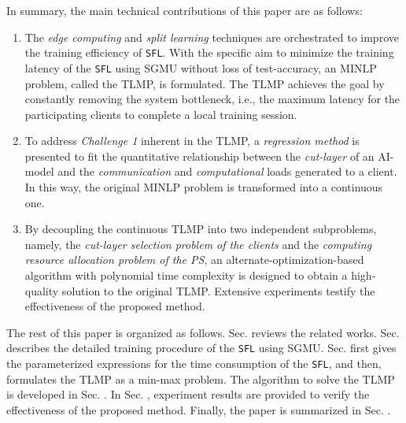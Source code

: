 \documentclass[10pt,journal,transmag]{IEEEtran}
\begin{document}
In summary, the main technical contributions of this paper are as follows:
\begin{enumerate}
    \item The \textit{edge computing} and \textit{split learning} techniques are orchestrated to improve the training efficiency of \texttt{SFL}.
    With the specific aim to minimize the training latency of the \texttt{SFL} using SGMU without loss of test-accuracy, an MINLP problem, called the TLMP, is formulated. The TLMP achieves the goal by constantly removing the system bottleneck, i.e., the maximum latency for the participating clients to complete a local training session.

    \item To address \textit{Challenge 1} inherent in the TLMP, a \textit{regression method} is presented to fit the quantitative relationship between the \textit{cut-layer} of an AI-model and the \textit{communication} and \textit{computational} loads generated to a client. In this way, the original MINLP problem is transformed into a continuous one.

    \item By decoupling the continuous TLMP into two independent subproblems, namely, the \textit{cut-layer selection problem of the clients} and the \textit{computing resource allocation problem of the PS}, an alternate-optimization-based algorithm with polynomial time complexity is designed to obtain a high-quality solution to the original TLMP. 
    Extensive experiments testify the effectiveness of the proposed method.       
\end{enumerate}

The rest of this paper is organized as follows. Sec. \uppercase\expandafter{} reviews the related works. Sec. \uppercase\expandafter{} describes the detailed training procedure of the \texttt{SFL} using SGMU. Sec. \uppercase\expandafter{} first gives the parameterized expressions for the time consumption of the \texttt{SFL}, and then, formulates the TLMP as a min-max problem. The algorithm to solve the TLMP is developed in Sec. \uppercase\expandafter{}. In Sec. \uppercase\expandafter{}, experiment results are provided to verify the effectiveness of the proposed method. Finally, the paper is summarized in Sec. \uppercase\expandafter{}.
\end{document}
